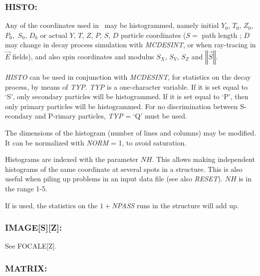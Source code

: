 \newpage

\subsubsection*{HISTO: \HISTOTitl}\label{HISTO} 
\medskip

Any of the coordinates used in \zgou\ may be histogrammed,
namely initial  $ Y_0$,  $ T_0$,  $ Z_0$,  $ P_0, $ $ S_0 $, $ D_0 $  or actual 
$ Y$, $T$, $Z$, $P$, $S$, $D$ particle coordinates ($ S=$ path length ;  
$ D $ may change  in decay process simulation with \textsl{MCDESINT}, 
or when ray-tracing in $ \vec  E $ fields), and also spin coordinates and
modulus $ S_X$, $ S_Y$,  $ S_Z $ and $ \left\Vert\vec  S \right\Vert   $.  
\bigskip

\noindent\textsl{HISTO}  can be used in conjunction with 
\textsl{MCDESINT}, for statistics 
on the decay process, by means of \textsl{TYP}.  \textsl{TYP} is a one-character 
variable.  If it is set equal to `S', only secondary particles will be 
histogrammed.  If it is set equal to `P', then only  primary particles will be histogrammed.  
For no discrimination  between S-econdary and P-rimary particles,  \textsl{TYP} = `Q'  must be
used.  
\bigskip

\noindent The dimensions of the histogram (number of lines and columns) may be
modified. It can be normalized with \textsl{NORM} = 1, to avoid saturation.  
\bigskip

\noindent Histograms are indexed with the parameter  $NH$.  This allows making
independent histograms of the same coordinate at several spots  
in a structure.  This is also useful when piling up problems in an input data 
file  (see also \textsl{RESET}). $NH$ is in the range 1-5.  
\bigskip

\noindent If \REBELOTE{} is used, the statistics on the $1+$\textsl{NPASS}
runs in the structure will add up. 

\vfill
\subsubsection*{IMAGE[S][Z]: \IMAGESZTitl}

\noindent See FOCALE[Z]. 
\vfill
\newpage

\subsubsection*{MATRIX: \MATRIXTitl}\label{MATRIX} 
\medskip

